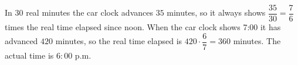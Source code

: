 In $30$ real minutes the car clock advances $35$ minutes, so it always shows $\dfrac{35}{30}=\dfrac{7}{6}$ times the real time elapsed since noon. When the car clock shows 7:00 it has advanced $420$ minutes, so the real time elapsed is $420\cdot\dfrac{6}{7}=360$ minutes. The actual time is $\boxed{6{:}00\text{ p.m.}}$
